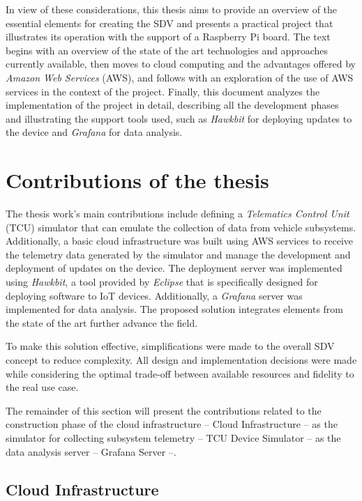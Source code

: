 \documentclass[10pt,a4paper,roman, twocolumn]{article}
\begin{document}
In view of these considerations, this thesis aims to provide an overview of the essential elements for creating the SDV and presents a practical project that illustrates its operation with the support of a Raspberry Pi board. The text begins with an overview of the state of the art technologies and approaches currently available, then moves to cloud computing and the advantages offered by \textit{Amazon Web Services} (AWS), and follows with an exploration of the use of AWS services in the context of the project. Finally, this document analyzes the implementation of the project in detail, describing all the development phases and illustrating the support tools used, such as \textit{Hawkbit} for deploying updates to the device and \textit{Grafana} for data analysis.

\section{Contributions of the thesis}

The thesis work's main contributions include defining a \textit{Telematics Control Unit} (TCU) simulator that can emulate the collection of data from vehicle subsystems. Additionally, a basic cloud infrastructure was built using AWS services to receive the telemetry data generated by the simulator and manage the development and deployment of updates on the device. The deployment server was implemented using \textit{Hawkbit}, a tool provided by \textit{Eclipse} that is specifically designed for deploying software to IoT devices. Additionally, a \textit{Grafana} server was implemented for data analysis. The proposed solution integrates elements from the state of the art further advance the field.

To make this solution effective, simplifications were made to the overall SDV concept to reduce complexity. All design and implementation decisions were made while considering the optimal trade-off between available resources and fidelity to the real use case.

The remainder of this section will present the contributions related to the construction phase of the cloud infrastructure -- Cloud Infrastructure -- as the simulator for collecting subsystem telemetry -- TCU Device Simulator -- as the data analysis server -- Grafana Server --. 

\subsection{Cloud Infrastructure}
\end{document}
